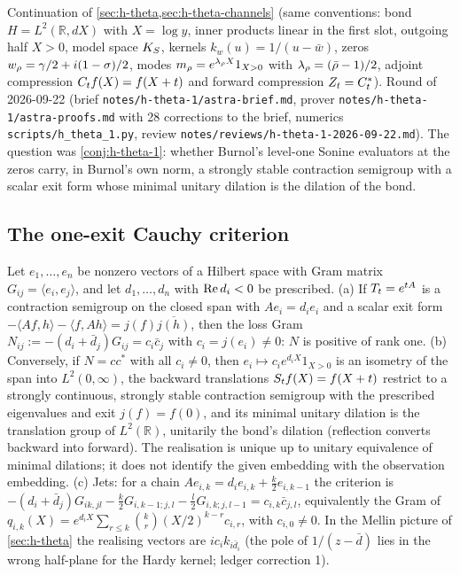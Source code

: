 Continuation of \cref{sec:h-theta,sec:h-theta-channels} (same conventions: bond $H = L^2(\mathbb R, dX)$ with $X = \log y$,
inner products linear in the first slot, outgoing half $X>0$, model space $K_S$, kernels $k_w(u) = 1/(u-\bar w)$, zeros
$w_\rho = \gamma/2 + i(1-\sigma)/2$, modes $m_\rho = e^{\lambda_\rho X}1_{X>0}$ with $\lambda_\rho = (\bar{\rho}-1)/2$,
adjoint compression $C_t f(X) = f(X+t)$ and forward compression $Z_t = C_t^{*}$). Round of 2026-09-22
(brief \texttt{notes/h-theta-1/astra-brief.md}, prover \texttt{notes/h-theta-1/astra-proofs.md} with 28 corrections to
the brief, numerics \texttt{scripts/h\_theta\_1.py}, review \texttt{notes/reviews/h-theta-1-2026-09-22.md}). The question
was \cref{conj:h-theta-1}: whether Burnol's level-one Sonine evaluators at the zeros carry, in Burnol's own norm, a
strongly stable contraction semigroup with a scalar exit form whose minimal unitary dilation is the dilation of the bond.

\subsection{The one-exit Cauchy criterion}

\begin{theorem}
\label{thm:continuous-one-exit-cauchy}
Let $e_1,\dots,e_n$ be nonzero vectors of a Hilbert space with Gram matrix $G_{ij} = \langle e_i,e_j\rangle$, and let
$d_1,\dots,d_n$ with $\operatorname{Re} d_i<0$ be prescribed. (a) If $T_t = e^{t A}$ is a contraction semigroup on the closed span
with $Ae_i = d_ie_i$ and a scalar exit form $-\langle Af,h\rangle-\langle f,Ah\rangle = j(f)\overline{j(h)}$, then the loss
Gram $N_{ij} := -(d_i+\bar d_j)G_{ij} = c_i\bar c_j$ with $c_i = j(e_i)\ne0$: $N$ is positive of rank one. (b) Conversely,
if $N = cc^{*}$ with all $c_i\ne0$, then $e_i\mapsto c_ie^{d_iX}1_{X>0}$ is an isometry of the span into $L^2(0,\infty)$,
the backward translations $S_t f(X) = f(X+t)$ restrict to a strongly continuous, strongly stable contraction
semigroup with the prescribed eigenvalues and exit $j(f) = f(0)$, and its minimal unitary dilation is the translation
group of $L^2(\mathbb R)$, unitarily the bond's dilation (reflection converts backward into forward). The realisation is
unique up to unitary equivalence of minimal dilations; it does not identify the given embedding with the observation
embedding. (c) Jets: for a chain $Ae_{i,k} = d_ie_{i,k}+\tfrac k2e_{i,k-1}$ the criterion is
$-(d_i+\bar d_j)G_{ik,jl}-\tfrac k2G_{i,k-1;j,l}-\tfrac l2G_{i,k;j,l-1} = c_{i,k}\bar c_{j,l}$, equivalently the Gram of
$q_{i,k}(X) = e^{d_iX}\sum_{r\le k}\binom kr(X/2)^{k-r}c_{i,r}$, with $c_{i,0}\ne0$. In the Mellin picture of
\cref{sec:h-theta} the realising vectors are $ic_ik_{i\bar d_i}$ (the pole of $1/(z-\bar d)$ lies in the wrong half-plane
for the Hardy kernel; ledger correction 1).
\end{theorem}

